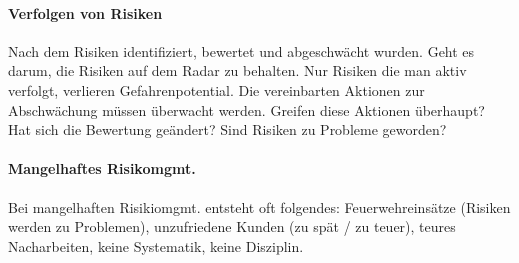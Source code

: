 \paragraph{Verfolgen von Risiken}
Nach dem Risiken identifiziert, bewertet und abgeschwächt wurden. Geht es darum, die Risiken auf dem Radar zu behalten. Nur Risiken die man aktiv verfolgt, verlieren Gefahrenpotential. Die vereinbarten Aktionen zur Abschwächung müssen überwacht werden. Greifen diese Aktionen überhaupt? Hat sich die Bewertung geändert? Sind Risiken zu Probleme geworden? 

\paragraph{Mangelhaftes Risikomgmt.}
Bei mangelhaften Risikiomgmt. entsteht oft folgendes: Feuerwehreinsätze (Risiken werden zu Problemen), unzufriedene Kunden (zu spät / zu teuer), teures Nacharbeiten, keine Systematik, keine Disziplin.
 